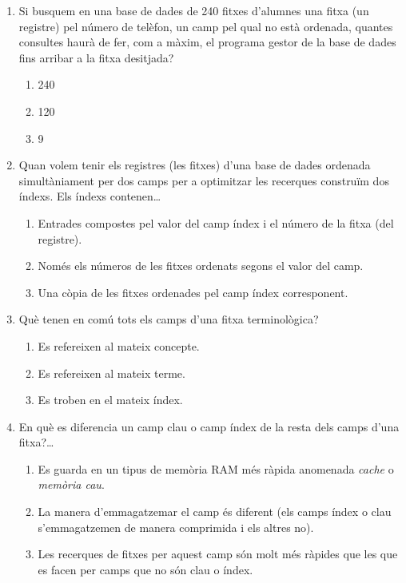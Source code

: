 \begin{enumerate}
\item Si busquem en una base de dades de 240 fitxes d'alumnes una
  fitxa (un registre) pel número de telèfon, un camp pel qual no està
  ordenada, quantes consultes haurà de fer, com a màxim, el programa
  gestor de la base de dades fins arribar a la fitxa desitjada?   
  \begin{enumerate}
  \item 240
  \item 120
  \item 9
  \end{enumerate}

\item Quan volem tenir els registres (les fitxes) d'una base de dades
  ordenada simultàniament per dos camps per a optimitzar les recerques
  construïm dos índexs. Els índexs contenen{\ldots}  
  \begin{enumerate}
  \item Entrades compostes pel valor del camp índex i el número de la
    fitxa (del registre).
  \item Només els números de les fitxes ordenats segons el valor del
    camp.
  \item Una còpia de les fitxes ordenades pel camp índex corresponent.
  \end{enumerate}

\item Què tenen en comú tots els camps d'una fitxa terminològica?
  \begin{enumerate}
  \item Es refereixen al mateix concepte.
  \item Es refereixen al mateix terme.
  \item Es troben en el mateix índex.
  \end{enumerate}

\item En què es diferencia un camp clau o camp índex de la resta dels
  camps d'una fitxa?{\ldots}
  \begin{enumerate}
  \item Es guarda en un tipus de memòria RAM més ràpida anomenada
    \emph{cache} o \emph{memòria cau}.
  \item La manera d'emmagatzemar el camp és diferent (els camps índex
    o clau s'emmagatzemen de manera comprimida i els altres no).
  \item Les recerques de fitxes per aquest camp són molt més ràpides
    que les que es facen per camps que no són clau o índex.
  \end{enumerate}


\end{enumerate}
